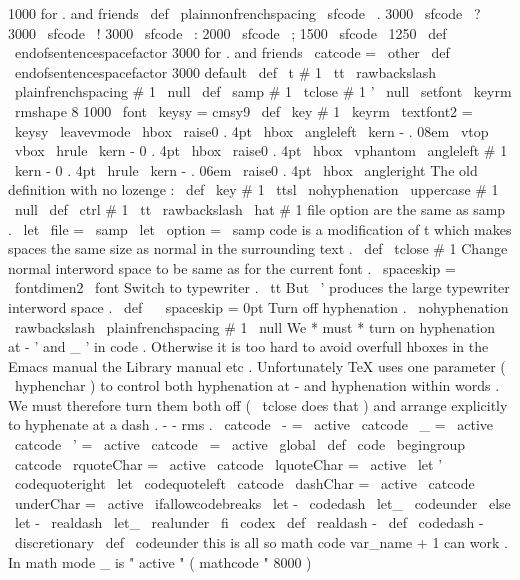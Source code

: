 {{{
1000
}
%
for
.
and
friends
}
\
def
\
plainnonfrenchspacing
{
%
\
sfcode
\
.
3000
\
sfcode
\
?
3000
\
sfcode
\
!
3000
\
sfcode
\
:
2000
\
sfcode
\
;
1500
\
sfcode
\
1250
\
def
\
endofsentencespacefactor
{
3000
}
%
for
.
and
friends
}
\
catcode
=
\
other
\
def
\
endofsentencespacefactor
{
3000
}
%
default
\
def
\
t
#
1
{
%
{
\
tt
\
rawbackslash
\
plainfrenchspacing
#
1
}
%
\
null
}
\
def
\
samp
#
1
{
\
tclose
{
#
1
}
'
\
null
}
\
setfont
\
keyrm
\
rmshape
{
8
}
{
1000
}
\
font
\
keysy
=
cmsy9
\
def
\
key
#
1
{
{
\
keyrm
\
textfont2
=
\
keysy
\
leavevmode
\
hbox
{
%
\
raise0
.
4pt
\
hbox
{
\
angleleft
}
\
kern
-
.
08em
\
vtop
{
%
\
vbox
{
\
hrule
\
kern
-
0
.
4pt
\
hbox
{
\
raise0
.
4pt
\
hbox
{
\
vphantom
{
\
angleleft
}
}
#
1
}
}
%
\
kern
-
0
.
4pt
\
hrule
}
%
\
kern
-
.
06em
\
raise0
.
4pt
\
hbox
{
\
angleright
}
}
}
}
%
The
old
definition
with
no
lozenge
:
%
\
def
\
key
#
1
{
{
\
ttsl
\
nohyphenation
\
uppercase
{
#
1
}
}
\
null
}
\
def
\
ctrl
#
1
{
{
\
tt
\
rawbackslash
\
hat
}
#
1
}
%
file
option
are
the
same
as
samp
.
\
let
\
file
=
\
samp
\
let
\
option
=
\
samp
%
code
is
a
modification
of
t
%
which
makes
spaces
the
same
size
as
normal
in
the
surrounding
text
.
\
def
\
tclose
#
1
{
%
{
%
%
Change
normal
interword
space
to
be
same
as
for
the
current
font
.
\
spaceskip
=
\
fontdimen2
\
font
%
%
Switch
to
typewriter
.
\
tt
%
%
But
\
'
produces
the
large
typewriter
interword
space
.
\
def
\
{
{
\
spaceskip
=
0pt
{
}
}
}
%
%
%
Turn
off
hyphenation
.
\
nohyphenation
%
\
rawbackslash
\
plainfrenchspacing
#
1
%
}
%
\
null
}
%
We
*
must
*
turn
on
hyphenation
at
-
'
and
_
'
in
code
.
%
Otherwise
it
is
too
hard
to
avoid
overfull
hboxes
%
in
the
Emacs
manual
the
Library
manual
etc
.
%
Unfortunately
TeX
uses
one
parameter
(
\
hyphenchar
)
to
control
%
both
hyphenation
at
-
and
hyphenation
within
words
.
%
We
must
therefore
turn
them
both
off
(
\
tclose
does
that
)
%
and
arrange
explicitly
to
hyphenate
at
a
dash
.
%
-
-
rms
.
{
\
catcode
\
-
=
\
active
\
catcode
\
_
=
\
active
\
catcode
\
'
=
\
active
\
catcode
\
=
\
active
%
\
global
\
def
\
code
{
\
begingroup
\
catcode
\
rquoteChar
=
\
active
\
catcode
\
lquoteChar
=
\
active
\
let
'
\
codequoteright
\
let
\
codequoteleft
%
\
catcode
\
dashChar
=
\
active
\
catcode
\
underChar
=
\
active
\
ifallowcodebreaks
\
let
-
\
codedash
\
let_
\
codeunder
\
else
\
let
-
\
realdash
\
let_
\
realunder
\
fi
\
codex
}
}
\
def
\
realdash
{
-
}
\
def
\
codedash
{
-
\
discretionary
{
}
{
}
{
}
}
\
def
\
codeunder
{
%
%
this
is
all
so
math
{
code
{
var_name
}
+
1
}
can
work
.
In
math
mode
_
%
is
"
active
"
(
mathcode
"
8000
)
}}
